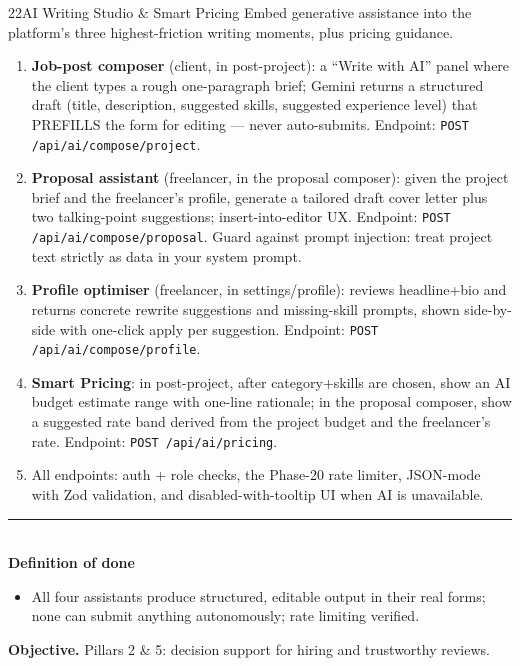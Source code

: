 \documentclass[11pt,a4paper]{article}
\newcommand{\dod}{\medskip\noindent\textcolor{donegreen}{\rule{\linewidth}{0.5pt}}\\[1mm]\textbf{\textcolor{donegreen}{Definition of done}}\\[-2mm]}
\newcommand{\objective}[1]{\noindent\textbf{Objective.} #1\medskip}
\begin{document}
\begin{promptbox}{22}{AI Writing Studio \& Smart Pricing}
Embed generative assistance into the platform's three highest-friction writing
moments, plus pricing guidance.

\begin{enumerate}[leftmargin=1.6em]
  \item \textbf{Job-post composer} (client, in post-project): a ``Write with AI''
        panel where the client types a rough one-paragraph brief; Gemini returns a
        structured draft (title, description, suggested skills, suggested experience
        level) that PREFILLS the form for editing --- never auto-submits.
        Endpoint: \texttt{POST /api/ai/compose/project}.
  \item \textbf{Proposal assistant} (freelancer, in the proposal composer): given
        the project brief and the freelancer's profile, generate a tailored draft
        cover letter plus two talking-point suggestions; insert-into-editor UX.
        Endpoint: \texttt{POST /api/ai/compose/proposal}. Guard against prompt
        injection: treat project text strictly as data in your system prompt.
  \item \textbf{Profile optimiser} (freelancer, in settings/profile): reviews
        headline+bio and returns concrete rewrite suggestions and missing-skill
        prompts, shown side-by-side with one-click apply per suggestion.
        Endpoint: \texttt{POST /api/ai/compose/profile}.
  \item \textbf{Smart Pricing}: in post-project, after category+skills are chosen,
        show an AI budget estimate range with one-line rationale; in the proposal
        composer, show a suggested rate band derived from the project budget and the
        freelancer's rate. Endpoint: \texttt{POST /api/ai/pricing}.
  \item All endpoints: auth + role checks, the Phase-20 rate limiter, JSON-mode with
        Zod validation, and disabled-with-tooltip UI when AI is unavailable.
\end{enumerate}

\dod
\begin{itemize}[leftmargin=1.6em]
  \item All four assistants produce structured, editable output in their real forms;
        none can submit anything autonomously; rate limiting verified.
\end{itemize}
\end{promptbox}

\objective{Pillars 2 \& 5: decision support for hiring and trustworthy reviews.}
\end{document}
